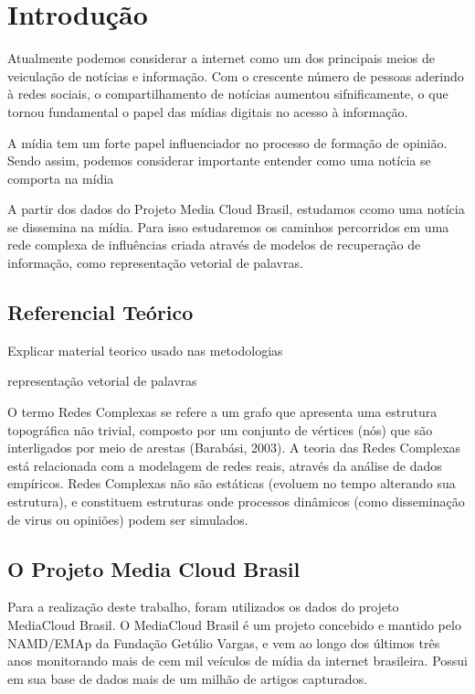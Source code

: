 \documentclass[a4paper,12pt]{article}
\begin{document}
\pagebreak

\section{Introdução}

Atualmente podemos considerar a internet como um dos principais meios de veiculação de notícias e informação. Com o crescente
número de pessoas aderindo à redes sociais, o compartilhamento de notícias aumentou sifnificamente, o que tornou fundamental
o papel das mídias digitais no acesso à informação.




A mídia tem um forte papel influenciador no processo de formação de opinião. Sendo assim, podemos considerar 
importante entender como uma notícia se comporta na mídia

A partir dos dados do Projeto Media Cloud Brasil, estudamos ccomo uma notícia se dissemina na mídia. Para isso
estudaremos os caminhos percorridos em uma rede complexa de influências criada através de modelos de recuperação de informação, 
como representação vetorial de palavras.

\subsection{Referencial Teórico}

Explicar material teorico usado nas metodologias

representação vetorial de palavras

O termo Redes Complexas se refere a um grafo que apresenta uma estrutura topográfica não trivial, composto por um conjunto
 de vértices (nós) que são interligados por meio de arestas (Barabási, 2003). A teoria das Redes Complexas  está relacionada com a modelagem de redes reais, através da 
 análise de dados empíricos. Redes Complexas não são estáticas (evoluem no tempo alterando sua estrutura), e 
 constituem estruturas onde processos dinâmicos (como disseminação de virus ou opiniões) podem ser simulados.
 
\subsection{O Projeto Media Cloud Brasil}

Para a realização deste trabalho, foram utilizados os dados do projeto MediaCloud Brasil. O MediaCloud Brasil é um projeto concebido e mantido pelo
NAMD/EMAp da Fundação Getúlio Vargas, e vem ao longo dos últimos três anos monitorando mais de cem mil veículos de mídia da internet brasileira. Possui em
sua base de dados mais de um milhão de artigos capturados.
\end{document}
